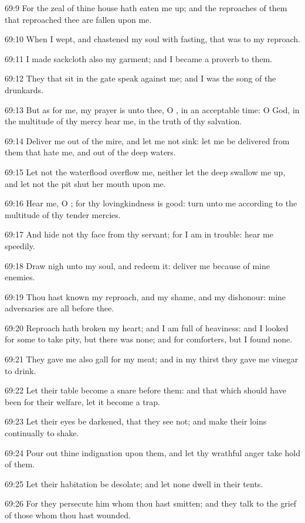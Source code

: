 69:9 For the zeal of thine house hath eaten me up; and the reproaches of them that reproached thee are fallen upon me.

69:10 When I wept, and chastened my soul with fasting, that was to my reproach.

69:11 I made sackcloth also my garment; and I became a proverb to them.

69:12 They that sit in the gate speak against me; and I was the song of the drunkards.

69:13 But as for me, my prayer is unto thee, O \LORD, in an acceptable time: O God, in the multitude of thy mercy hear me, in the truth of thy salvation.

69:14 Deliver me out of the mire, and let me not sink: let me be delivered from them that hate me, and out of the deep waters.

69:15 Let not the waterflood overflow me, neither let the deep swallow me up, and let not the pit shut her mouth upon me.

69:16 Hear me, O \LORD; for thy lovingkindness is good: turn unto me according to the multitude of thy tender mercies.

69:17 And hide not thy face from thy servant; for I am in trouble: hear me speedily.

69:18 Draw nigh unto my soul, and redeem it: deliver me because of mine enemies.

69:19 Thou hast known my reproach, and my shame, and my dishonour: mine adversaries are all before thee.

69:20 Reproach hath broken my heart; and I am full of heaviness: and I looked for some to take pity, but there was none; and for comforters, but I found none.

69:21 They gave me also gall for my meat; and in my thirst they gave me vinegar to drink.

69:22 Let their table become a snare before them: and that which should have been for their welfare, let it become a trap.

69:23 Let their eyes be darkened, that they see not; and make their loins continually to shake.

69:24 Pour out thine indignation upon them, and let thy wrathful anger take hold of them.

69:25 Let their habitation be desolate; and let none dwell in their tents.

69:26 For they persecute him whom thou hast smitten; and they talk to the grief of those whom thou hast wounded.

